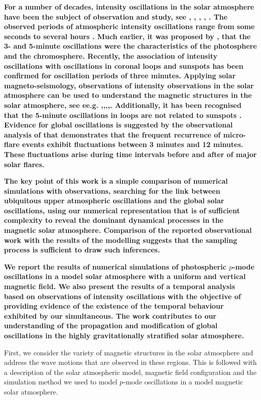 \documentclass[linenumbers]{aastex63}
\newcommand{\bcr}{\bf\color{red}} %
\begin{document}
 
{\bcr
For a number of decades, intensity oscillations in the solar atmosphere have been the subject of observation and study, see \citet{Banerjee2011}, \citet{deMoortel2009}, \citet{Mathioudakis2013}, \citet{Ruderman2009}, \citet{Wang2011}. The observed periods of atmospheric intensity oscillations range from some seconds to several hours \citet{Auchere2014}. Much earlier, it was proposed by \citet{Jensen1963}, that the 3- and 5-minute oscillations were the characteristics of the photosphere and the chromosphere. Recently, the association of intensity oscillations with oscillations in coronal loops and sunspots has been confirmed for oscillation periods of three minutes. Applying solar magneto-seismology, observations of intensity observations in the solar atmosphere can be used to understand the magnetic structures in the solar atmosphere, see ee.g. \citet{Roberts1984},\citet{Banerjee2007},\citet{Zaqarashvili2007},\citet{Erdelyi2008},\citet{Verth2010}.  Additionally, it has been recognised that the 5-minute oscillations in loops are not related to sunspots \citet{deMoortel2002}. Evidence for global oscillations is suggested by the observational analysis of \citet{Gyenge2018} that demonstrates that the frequent recurrence of micro-flare events exhibit fluctuations between 3 minutes and 12 minutes. These fluctuations arise during time intervals before and after of major solar flares.
}

{\bcr
The key point of this work is a simple comparison of numerical simulations with observations, searching for the link between ubiquitous upper atmospheric oscillations and the global solar oscillations, using our numerical representation that is of sufficient complexity to reveal the dominant dynamical processes in the magnetic solar atmosphere. Comparison of the reported observational work with the results of the modelling suggests that the sampling process is sufficient to draw such inferences.
}

{\bcr
We report the results of numerical simulations of photospheric $p$-mode oscillations in a model solar atmosphere with a uniform and vertical magnetic field. We also present the results of a temporal analysis based on observations of intensity oscillations with the objective of providing evidence of the existence of the temporal behaviour exhibited by our simultaneous. The work contributes to our understanding of the propagation and modification of global oscillations in the highly gravitationally stratified solar atmosphere. 
}


First, we consider the variety of magnetic structures in the solar atmosphere and address the wave motions that are observed in these regions. This is followed with a description of the solar atmospheric model, magnetic field configuration and the simulation method we used to model $p$-mode oscillations in a model magnetic solar atmosphere.
\end{document}
